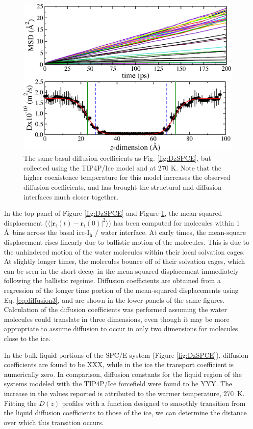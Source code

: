 \begin{figure}
\includegraphics[width=\linewidth]{Figures/DzTIP4PIce}
\caption{\label{fig:DzTIP4PIce} The same basal diffusion coefficients
  as Fig. \ref{fig:DzSPCE}, but collected using the TIP4P/Ice model
  and at 270 K. Note that the higher coexistence temperature for this
  model increases the observed diffusion coefficients, and has brought
  the structural and diffusion interfaces much closer together.}
\end{figure}

In the top panel of Figure \ref{fig:DzSPCE} and Figure
\ref{fig:DzTIP4PIce}, the mean-squared displacement
($\langle | \bm{r}_i(t) - \bm{r}_i(0) |^2 \rangle $) has been computed
for molecules within 1 \AA~bins across the basal ice-I$_\mathrm{h}$ /
water interface. At early times, the mean-square displacement rises
linearly due to ballistic motion of the molecules. This is due to the
unhindered motion of the water molecules within their local solvation
cages. At slightly longer times, the molecules bounce off of their
solvation cages, which can be seen in the short decay in the
mean-squared displacement immediately following the ballistic
regeime. Diffusion coefficients are obtained from a regression of the
longer time portion of the mean-squared displacements using
Eq. \eqref{eq:diffusion3}, and are shown in the lower panels of the
same figures. Calculation of the diffusion coefficients was performed
assuming the water molecules could translate in three dimensions, even
though it may be more appropriate to assume diffusion to occur in only
two dimensions for molecules close to the ice. 

In the bulk liquid portions of the SPC/E system (Figure
\ref{fig:DzSPCE}), diffusion coefficients are found to be XXX, while
in the ice the transport coefficient is numerically zero. In
comparison, diffusion constants for the liquid region of the systems
modeled with the TIP4P/Ice forcefield were found to be YYY. The
increase in the values reported is attributed to the warmer
temperature, 270~K. Fitting the $D(z)$ profiles with a function
designed to smoothly transition from the liquid diffusion coefficients
to those of the ice, we can determine the distance over which this
transition occurs.

